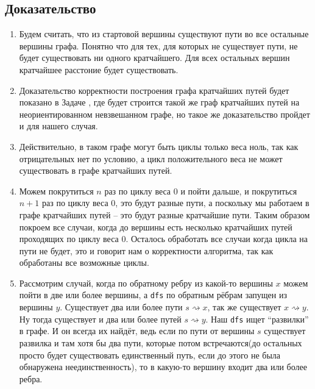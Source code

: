 \documentclass{article}
\begin{document}
    \subsection*{Доказательство}
    \begin{enumerate}
        \item Будем считать, что из стартовой вершины существуют пути во все остальные вершины графа. Понятно что для тех, для которых не существует пути, не будет существовать ни одного кратчайшего. Для всех остальных вершин кратчайшее расстоние будет существовать. 
        \item Доказательство корректности построения графа кратчайших путей будет показано в Задаче , где будет строится такой же граф кратчайших путей на неориентированном невзвешанном графе, но такое же доказательство пройдет и для нашего случая.
        \item Действительно, в таком графе могут быть циклы только веса ноль, так как отрицательных нет по условию, а цикл положительного веса  не может существовать в графе кратчайших путей.
        \item Можем покрутиться $n$ раз по циклу веса 0 и пойти дальше, и покрутиться $n + 1$ раз по циклу веса 0, это будут разные пути, а поскольку мы работаем в графе кратчайших путей -- это будут разные кратчайшие пути. Таким образом покроем все случаи, когда до вершины есть несколько кратчайших путей проходящих по циклу веса 0. Осталось обработать все случаи когда цикла на пути не будет, это и говорит нам о корректности алгоритма, так как обработаны все возможные циклы.
        \item Рассмотрим случай, когда по обратному ребру из какой-то вершины $x$ можем пойти в две или более вершины, а \texttt{dfs} по обратным рёбрам запущен из вершины $y$. Существует два или более пути $s \rightsquigarrow x$, так же существует $x \rightsquigarrow y$. Ну тогда существует и два или более путей $s \rightsquigarrow y$. Наш \texttt{dfs} ищет ``развилки'' в графе. И он всегда их найдёт, ведь если по пути от вершины $s$ существует развилка и там хотя бы два пути, которые потом встречаются(до остальных просто будет существовать единственный путь, если до этого не была обнаружена неединственность), то в какую-то вершину входит два или более ребра.
    \end{enumerate}
\end{document}
